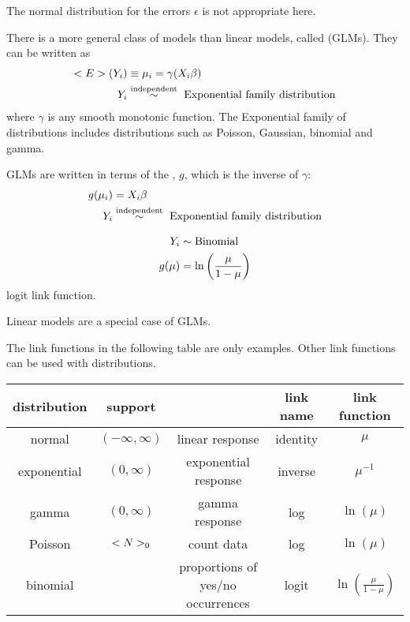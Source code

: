 \begin{example}
	The normal distribution for the errors $\epsilon$ is not appropriate here.
\end{example}

There is a more general class of models than linear models, called  (GLMs). They can be written as
\begin{align}
	\mathbb{E}(Y_i) &\equiv \mu_i =\gamma(X_i\beta) \notag \\
	Y_i &\overset{\text{independent}}{\sim} \text{ Exponential family distribution} \notag
\end{align}
where $\gamma$ is any smooth monotonic function. The Exponential family of distributions includes distributions such as Poisson, Gaussian, binomial and gamma.

GLMs are written in terms of the , $g$, which is the inverse of $\gamma$:
\begin{align}
	g(\mu_i) &= X_i\beta \notag \\
	Y_i &\overset{\text{independent}}{\sim} \text{ Exponential family distribution} \notag
\end{align}

\begin{example}
	\begin{align}
		Y_i &\sim \text{Binomial} \notag \\
		g(\mu) &= \ln\left(\frac{\mu}{1-\mu}\right)\notag
	\end{align}
	logit link function.
\end{example}

\begin{example}
	Linear models are a special case of GLMs.
\end{example}

The link functions in the following table are only examples. Other link functions can be used with distributions.
\begin{center}
	\begin{tabular}{c|c|c|c|c}
		\textbf{distribution} & \textbf{support} & \text{use} & \textbf{link name} & \textbf{link function} \\
		\hline
		normal & $(-\infty,\infty)$ & linear response & identity & $\mu$ \\
		exponential & $(0,\infty)$ & exponential response & inverse & $\mu^{-1}$ \\
		gamma & $(0,\infty)$ & gamma response & log & $\ln(\mu)$ \\
		Poisson & $\natur_0$ & count data & log & $\ln(\mu)$ \\
		binomial & & proportions of yes/no occurrences & logit & $\ln\left(\frac{\mu}{1-\mu}\right)$
	\end{tabular}
\end{center}

